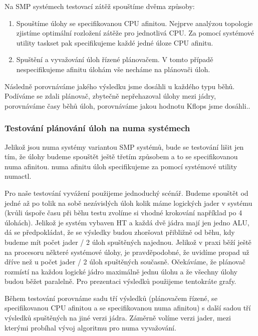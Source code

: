 \documentclass[a4paper,12pt]{article}
\begin{document}
\noindent
Na SMP systémech testovací zátěž spouštíme dvěma způsoby:
\begin{enumerate}
\item Spouštíme úlohy se specifikovanou CPU afinitou. Nejprve analýzou topologie zjistíme optimální rozložení zátěže pro jednotlivá CPU. Za pomocí systémové utility taskset pak specifikujeme každé jedné úloze CPU afinitu.  
\item Spuštění a vyvažování úloh řízené plánovačem. V tomto případě nespecifikujeme afinitu úlohám vše necháme na plánovači úloh.
\end{enumerate}

Následně porovnáváme jakého výsledku jsme dosáhli u každého typu běhů. Podíváme se zdali plánovač, zbytečně nepřehazoval úlohy mezi jádry, porovnáváme časy běhů úloh, porovnáváme jakou hodnotu Kflops jsme dosáhli..

\subsubsection{Testování plánování úloh na numa systémech}

Jelikož jsou numa systémy variantou SMP systémů, bude se testování lišit jen tím, že úlohy budeme spouštět ještě třetím způsobem a to se specifikovanou numa afinitou. numa afinitu úloh specifikujeme za pomocí systémové utility numactl.

Pro naše testování vyvážení použijeme jednoduchý scénář. Budeme spouštět od jedné až po tolik na sobě nezávislých úloh kolik máme logických jader v systému (kvůli úspoře času při běhu testu zvolíme si vhodné krokování například po 4 úlohách). Jelikož je systém vybaven HT a každá dvě jádra mají jen jedno ALU, dá se předpokládat, že se výsledky budou zhoršovat přibližně od běhu, kdy budeme mít počet jader / 2 úloh spuštěných najednou. Jelikož v praxi běží ještě na procesoru některé systémové úlohy, je pravděpodobné, že uvidíme propad už dříve než u počet jader / 2 úloh spuštěných současně. Očekáváme, že plánovač rozmístí na každou logické jádro maximálně jednu úlohu a že všechny úlohy budou běžet paralelně. Pro prezentaci výsledků použijeme tentokráte grafy.

Během testování porovnáme sadu tří výsledků (plánovačem řízené, se specifikovanou CPU afinitou a se specifikovanou numa afinitou) s další sadou tří výsledků spuštěných na jiné verzi jádra. Záměrně volíme verzi jader, mezi kterými probíhal vývoj algoritmu pro numa vyvažování.
\end{document}
